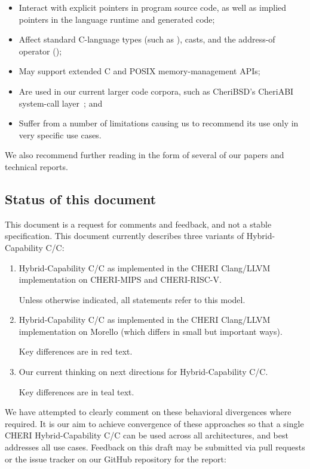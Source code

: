 \documentclass[12pt,twoside,openright,a4paper]{article}
\newcommand{\ccode}[1]{{\small\ttfamily{#1}}}
\newcommand{\cintptrt}{{\ccode{intptr\_t}}\xspace}
\newcommand{\futurevariant}[1]{{\color{teal} #1}}
\newcommand{\morellovariant}[1]{{\color{red} #1}}
\newcommand*{\cpp}{\texorpdfstring{C\textsmaller[2]{\protect\nolinebreak[4]\hspace{-.05em}\raisebox{.45ex}{\textbf{++}}}}{C++}}
\newcommand*{\COrCpp}{C/\cpp{}}
\newcommand*{\hybridCOrCpp}{Hybrid-Capability \COrCpp{}}
\newcommand*{\CHERIhybridCOrCpp}{CHERI \hybridCOrCpp{}}
\begin{document}
\begin{itemize}
\item Interact with explicit pointers in program source code, as well as
  implied pointers in the language runtime and generated code;
\item Affect standard C-language types (such as \cintptrt{}), casts, and the
  address-of operator (\ccode{\&});
\item May support extended C and POSIX memory-management APIs;
\item Are used in our current larger code corpora, such as CheriBSD's
  CheriABI system-call layer~\cite{davis2019:cheriabi}; and
\item Suffer from a number of limitations causing us to recommend its use
  only in very specific use cases.
\end{itemize}

\noindent
We also recommend further reading in the form of several of our papers and
technical reports.

\subsection{Status of this document}

This document is a request for comments and feedback, and not a stable
specification.
This document currently describes three variants of \hybridCOrCpp{}:

\begin{enumerate}
\item \hybridCOrCpp{} as implemented in the CHERI Clang/LLVM implementation on
  CHERI-MIPS and CHERI-RISC-V.

  Unless otherwise indicated, all statements refer to this model.

\item \hybridCOrCpp{} as implemented in the CHERI Clang/LLVM implementation on
  Morello (which differs in small but important ways).

  Key differences are in \morellovariant{red text}.

\item Our current thinking on next directions for \hybridCOrCpp{}.

  Key differences are in \futurevariant{teal text}.
\end{enumerate}

\noindent
We have attempted to clearly comment on these behavioral divergences where
required.
It is our aim to achieve convergence of these approaches so that a single
\CHERIhybridCOrCpp{} can be used across all architectures, and best addresses
all use cases.
Feedback on this draft may be submitted via pull requests or the issue tracker
on our GitHub repository for the report:
\end{document}
